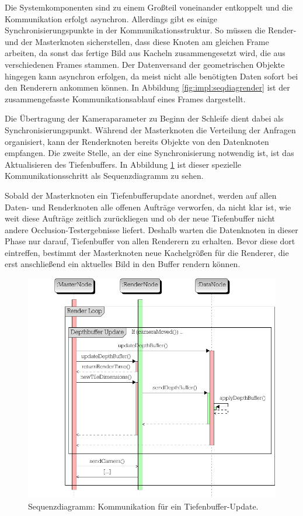 Die Systemkomponenten sind zu einem Großteil voneinander entkoppelt und die Kommunikation erfolgt asynchron. Allerdings gibt es einige Synchronisierungspunkte in der Kommunikationsstruktur. So müssen die Render- und der Masterknoten sicherstellen, dass diese Knoten am gleichen Frame arbeiten, da sonst das fertige Bild aus Kacheln zusammengesetzt wird, die aus verschiedenen Frames stammen. Der Datenversand der geometrischen Objekte hingegen kann asynchron erfolgen, da meist nicht alle benötigten Daten sofort bei den Renderern ankommen können. In Abbildung \ref{fig:impl:seqdiagrender} ist der zusammengefasste Kommunikationsablauf eines Frames dargestellt. 

Die Übertragung der Kameraparameter zu Beginn der Schleife dient dabei als Synchronisierungspunkt. Während der Masterknoten die Verteilung der Anfragen organisiert, kann der Renderknoten bereits Objekte von den Datenknoten empfangen. Die zweite Stelle, an der eine Synchronisierung notwendig ist, ist das Aktualisieren des Tiefenbuffers. In Abbildung \ref{fig:impl:seqdiagdepth} ist dieser spezielle Kommunikationsschritt als Sequenzdiagramm zu sehen. 

Sobald der Masterknoten ein Tiefenbufferupdate anordnet, werden auf allen Daten- und Renderknoten alle offenen Aufträge verworfen, da nicht klar ist, wie weit diese Aufträge zeitlich zurückliegen und ob der neue Tiefenbuffer nicht andere Occlusion-Testergebnisse liefert. Deshalb warten die Datenknoten in dieser Phase nur darauf, Tiefenbuffer von allen Renderern zu erhalten. Bevor diese dort eintreffen, bestimmt der Masterknoten neue Kachelgrößen für die Renderer, die erst anschließend ein aktuelles Bild in den Buffer rendern können.

\begin{figure}
\centering
\includegraphics[scale=0.85]{images/seq_diag_depth.pdf}
  \caption{\label{fig:impl:seqdiagdepth}Sequenzdiagramm: Kommunikation für ein Tiefenbuffer-Update.}
\end{figure}

%
%
